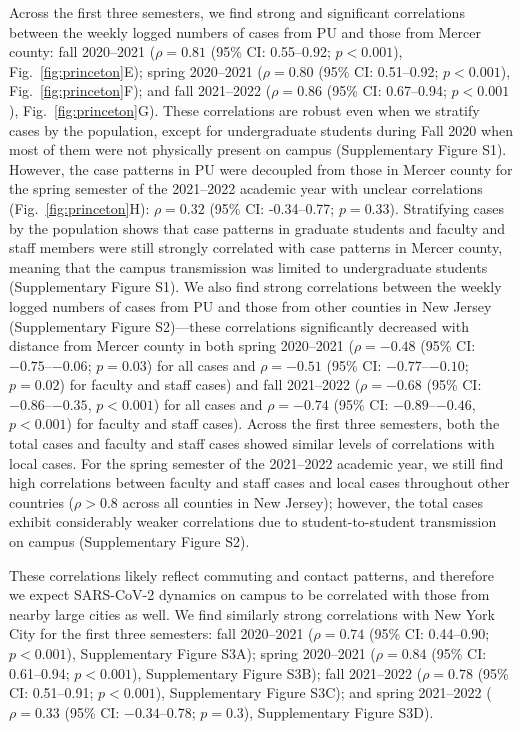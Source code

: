 \documentclass[12pt]{article}
\newcommand{\fref}[1]{Fig.~\ref{fig:#1}}
\begin{document}
Across the first three semesters, we find strong and significant correlations between the weekly logged numbers of cases from PU and those from Mercer county:
fall 2020--2021 ($\rho = 0.81$ (95\% CI: 0.55--0.92; $p < 0.001$), \fref{princeton}E); spring 2020--2021 ($\rho = 0.80$ (95\% CI: 0.51--0.92; $p < 0.001$), \fref{princeton}F); and fall 2021--2022 ($\rho = 0.86$ (95\% CI: 0.67--0.94; $p < 0.001$), \fref{princeton}G). 
These correlations are robust even when we stratify cases by the population, except for undergraduate students during Fall 2020 when most of them were not physically present on campus (Supplementary Figure S1).
However, the case patterns in PU were decoupled from those in Mercer county for the spring semester of the 2021--2022 academic year with unclear correlations (\fref{princeton}H): $\rho = 0.32$ (95\% CI: -0.34--0.77; $p = 0.33$).
Stratifying cases by the population shows that case patterns in graduate students and faculty and staff members were still strongly correlated with case patterns in Mercer county, meaning that the campus transmission was limited to undergraduate students (Supplementary Figure S1). 
We also find strong correlations between the weekly logged numbers of cases from PU and those from other counties in New Jersey (Supplementary Figure S2)---these correlations significantly decreased with distance from Mercer county in both spring 2020--2021 ($\rho=-0.48$ (95\% CI: $-0.75$--$-0.06$; $p = 0.03$) for all cases and $\rho=-0.51$ (95\% CI: $-0.77$--$-0.10$; $p = 0.02$) for faculty and staff cases) and fall 2021--2022 ($\rho=-0.68$ (95\% CI: $-0.86$--$-0.35$, $p < 0.001$) for all cases and $\rho=-0.74$ (95\% CI: $-0.89$--$-0.46$, $p < 0.001$) for faculty and staff cases).
Across the first three semesters, both the total cases and faculty and staff cases showed similar levels of correlations with local cases. 
For the spring semester of the 2021--2022 academic year, we still find high correlations between faculty and staff cases and local cases throughout other countries ($\rho > 0.8$ across all counties in New Jersey); however, the total cases exhibit considerably weaker correlations due to student-to-student transmission on campus (Supplementary Figure S2).    

These correlations likely reflect commuting and contact patterns, and therefore we expect SARS-CoV-2 dynamics on campus to be correlated with those from nearby large cities as well. 
We find similarly strong correlations with New York City for the first three semesters: fall 2020--2021 ($\rho = 0.74$ (95\% CI: 0.44--0.90; $p < 0.001$), Supplementary Figure S3A); spring 2020--2021 ($\rho = 0.84$ (95\% CI: 0.61--0.94; $p < 0.001$), Supplementary Figure S3B); fall 2021--2022 ($\rho = 0.78$ (95\% CI: 0.51--0.91; $p < 0.001$), Supplementary Figure S3C); and spring 2021--2022 ($\rho = 0.33$ (95\% CI: $-0.34$--0.78; $p=0.3$), Supplementary Figure S3D).
\end{document}

